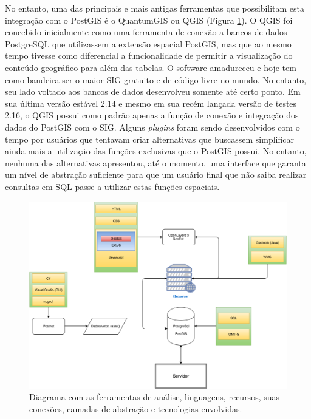 No entanto, uma das principais e mais antigas ferramentas que possibilitam esta integração com o PostGIS é o QuantumGIS ou QGIS (Figura \ref{fig:diagrama}). O QGIS foi concebido inicialmente como uma ferramenta de conexão a bancos de dados PostgreSQL que utilizassem a extensão espacial PostGIS, mas que ao mesmo tempo tivesse como diferencial a funcionalidade de permitir a visualização do conteúdo geográfico para além das tabelas. O software amadureceu e hoje tem como bandeira ser o maior SIG gratuito e de código livre no mundo. No entanto, seu lado voltado aos bancos de dados desenvolveu somente até certo ponto. Em sua última versão estável 2.14 e mesmo em sua recém lançada versão de testes 2.16, o QGIS possui como padrão apenas a função de conexão e integração dos dados do PostGIS com o SIG. Alguns \textit{plugins} foram sendo desenvolvidos com o tempo por usuários que tentavam criar alternativas que buscassem simplificar ainda mais a utilização das funções exclusivas que o PostGIS possui. No entanto, nenhuma das alternativas apresentou, até o momento, uma interface que garanta um nível de abstração suficiente para que um usuário final que não saiba realizar consultas em SQL passe a utilizar estas funções espaciais.	

	\begin{figure}
		\centering
		\includegraphics[width=1\linewidth]{data/diagrama}
		\caption{Diagrama com as ferramentas de análise, linguagens, recursos, suas conexões, camadas de abstração e tecnologias envolvidas.}
		\label{fig:diagrama}
	\end{figure}
	


